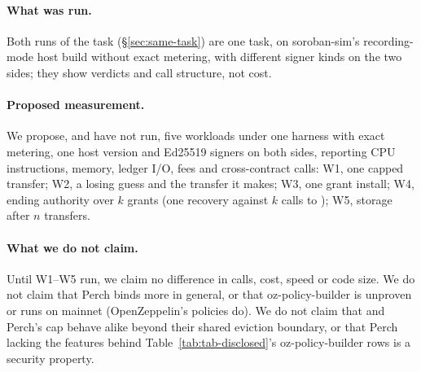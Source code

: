 \paragraph{What was run.} Both runs of the task (\S\ref{sec:same-task}) are one
task, on soroban-sim's recording-mode host build without exact metering, with
different signer kinds on the two sides; they show verdicts and call structure,
not cost.

\paragraph{Proposed measurement.} We propose, and have not run, five workloads
under one harness with exact metering, one host version and Ed25519 signers on
both sides, reporting CPU instructions, memory, ledger I/O, fees and
cross-contract calls: W1, one capped transfer; W2, a losing guess and the
transfer it makes; W3, one grant install; W4, ending authority over $k$ grants
(one recovery against $k$ calls to ); W5, storage
after $n$ transfers.

\paragraph{What we do not claim.} Until W1--W5 run, we claim no difference in
calls, cost, speed or code size. We do not claim that Perch
binds more in general, or that oz-policy-builder is unproven or runs on mainnet
(OpenZeppelin's  policies do). We do not claim that  and Perch's cap behave alike
beyond their shared eviction boundary, or that Perch lacking the features
behind Table~\ref{tab:tab-disclosed}'s oz-policy-builder rows is a security property.
